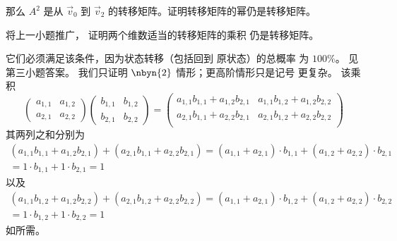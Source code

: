 \begin{exercises}
\begin{exparts}
        那么 $A^2$ 是从 $\vec{v}_0$ 到 $\vec{v}_2$ 的转移矩阵。证明转移矩阵的幂仍是转移矩阵。
      \item 将上一小题推广，
        证明两个维数适当的转移矩阵的乘积
        仍是转移矩阵。
    \end{exparts}
    \begin{answer}
      \begin{exparts}
        \partsitem 它们必须满足该条件，因为状态转移（包括回到
          原状态）的总概率
          为 $100\%$。
        \partsitem 见第三小题答案。
        \partsitem 我们只证明
          $\nbyn{2}$ 情形；更高阶情形只是记号
          更复杂。
          该乘积
          \begin{equation*}
            \begin{pmatrix}
              a_{1,1}  &a_{1,2}  \\
              a_{2,1}  &a_{2,2}  
            \end{pmatrix}
            \begin{pmatrix}
              b_{1,1}  &b_{1,2}  \\
              b_{2,1}  &b_{2,2}  
            \end{pmatrix}
            =\begin{pmatrix}
              a_{1,1}b_{1,1}+a_{1,2}b_{2,1}  &a_{1,1}b_{1,2}+a_{1,2}b_{2,2} \\
              a_{2,1}b_{1,1}+a_{2,2}b_{2,1}  &a_{2,1}b_{1,2}+a_{2,2}b_{2,2} \\
            \end{pmatrix}
           \end{equation*}
            其两列之和分别为
            \begin{multline*}
              (a_{1,1}b_{1,1}+a_{1,2}b_{2,1})
              +(a_{2,1}b_{1,1}+a_{2,2}b_{2,1})
              =(a_{1,1}+a_{2,1})\cdot b_{1,1}
                +(a_{1,2}+a_{2,2})\cdot b_{2,1}            \\
              =1\cdot b_{1,1}+1\cdot b_{2,1}
              =1
            \end{multline*}
            以及
            \begin{multline*}
              (a_{1,1}b_{1,2}+a_{1,2}b_{2,2})
              +(a_{2,1}b_{1,2}+a_{2,2}b_{2,2})
              =(a_{1,1}+a_{2,1})\cdot b_{1,2}
                +(a_{1,2}+a_{2,2})\cdot b_{2,2}              \\
              =1\cdot b_{1,2}+1\cdot b_{2,2}
              =1
            \end{multline*}
            如所需。
      \end{exparts}
    \end{answer}
\end{exercises}


